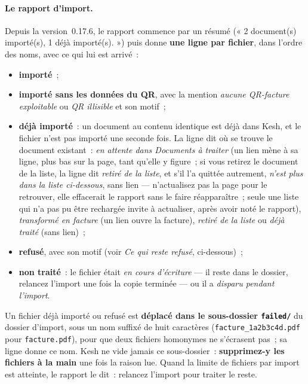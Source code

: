 \documentclass[a4paper,11pt,oneside]{article}
\begin{document}
\paragraph{Le rapport d'import.} Depuis la version~0.17.6, le rapport commence par un
résumé (« 2 document(s) importé(s), 1 déjà importé(s). ») puis donne \textbf{une ligne
par fichier}, dans l'ordre des noms, avec ce qui lui est arrivé~:
\begin{itemize}
    \item \textbf{importé}~;
    \item \textbf{importé sans les données du QR}, avec la mention \emph{aucune QR-facture
          exploitable} ou \emph{QR illisible} et son motif~;
    \item \textbf{déjà importé}~: un document au contenu identique est déjà dans Kesh, et
          le fichier n'est pas importé une seconde fois. La ligne dit où se trouve le
          document existant~: \emph{en attente dans Documents à traiter} (un lien mène à
          sa ligne, plus bas sur la page, tant qu'elle y figure~; si vous retirez le
          document de la liste, la ligne dit \emph{retiré de la liste}, et s'il l'a quittée
          autrement, \emph{n'est plus dans la liste ci-dessous}, sans lien --- n'actualisez
          pas la page pour le retrouver, elle effacerait le rapport sans le faire
          réapparaître~; seule une liste qui n'a pas pu être rechargée invite à
          actualiser, après avoir noté le rapport), \emph{transformé en facture} (un lien ouvre la
          facture), \emph{retiré de la liste} ou \emph{déjà traité} (sans lien)~;
    \item \textbf{refusé}, avec son motif (voir \emph{Ce qui reste refusé}, ci-dessous)~;
    \item \textbf{non traité}~: le fichier était \emph{en cours d'écriture} --- il reste
          dans le dossier, relancez l'import une fois la copie terminée --- ou il a
          \emph{disparu pendant l'import}.
\end{itemize}
Un fichier déjà importé ou refusé est \textbf{déplacé dans le sous-dossier
\texttt{failed/}} du dossier d'import, sous un nom suffixé de huit caractères
(\texttt{facture\_1a2b3c4d.pdf} pour \texttt{facture.pdf}), pour que deux fichiers
homonymes ne s'écrasent pas~; sa ligne donne ce nom. Kesh ne vide jamais ce
sous-dossier~: \textbf{supprimez-y les fichiers à la main} une fois la raison lue. Quand
la limite de fichiers par import est atteinte, le rapport le dit~: relancez l'import pour
traiter le reste.
\end{document}
